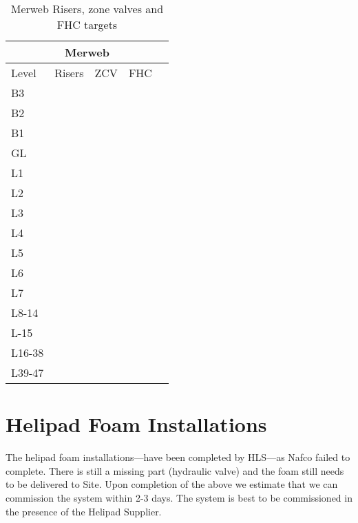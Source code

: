 \begin{table}[htbp]\label{fire3}
\begin{center}
\begin{tabular}{lllll}
\toprule
\multicolumn{5}{c}{Merweb}\\
\midrule
Level	&Risers &ZCV	&FHC  &\WIR\\
\midrule
B3	&\checkmark     &\checkmark	 &\checkmark  &\\
B2	&\checkmark     &\checkmark	 &\checkmark  &\\
B1	&\checkmark     &\checkmark	 &\checkmark  &\\
GL	&\checkmark     &\checkmark	 &\checkmark  &\\
L1	&\checkmark     &\checkmark	 &\checkmark  &\\
L2	&\checkmark     &\checkmark	 &\checkmark  &\\
L3	&\checkmark     &\checkmark	 &\checkmark  &\\
L4	&\checkmark     &\checkmark	 &\checkmark  &\\
L5	&\checkmark     &\checkmark	 &\checkmark  &\\
L6	&\checkmark     &\checkmark	 &\checkmark  &\\
L7	&\checkmark     &\checkmark	 &\checkmark  &\\
\midrule
L8-14	 &\checkmark     &\checkmark	 &\checkmark  &\\
L-15	     &\checkmark     &\checkmark	 &\checkmark  &\\
L16-38	&\checkmark     &\checkmark	 &\checkmark  &\\
L39-47	&\checkmark     &\checkmark	 &\checkmark  &\\
\bottomrule
\end{tabular}
\caption{Merweb Risers, zone valves and FHC targets}
\end{center}
\end{table}

\section{Helipad Foam Installations}

The helipad foam installations---have been completed by HLS---as Nafco failed to complete. There is still a missing part (hydraulic valve) and the foam still needs to be delivered to Site. Upon completion of the above we estimate that we can commission the system within 2-3 days. The system is best to be commissioned in the presence of the Helipad Supplier.



